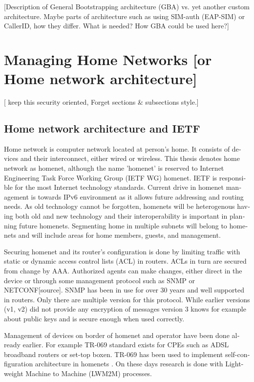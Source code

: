 \documentclass[12pt,a4paper,english]{tutthesis}
\begin{document}
\begin{otherlanguage}{english}
[Description of General Bootstrapping architecture (GBA) vs. yet
another custom architecture. Maybe parts of architecture
such as using SIM-auth (EAP-SIM) or CallerID, how they differ. 
What is needed? How GBA could be used here?]
\chapter{Managing Home Networks [or Home network architecture]}
\label{sec-3}
[ keep this security oriented, Forget sections \& subsections style.]

\section{Home network architecture and IETF}
\label{sec-3-1}


Home network is computer network located at person's home. It consists
of devices and their interconnect, either wired or wireless.  This
thesis denotes home network as homenet, although the name 'homenet'
is reserved to Internet Engineering Task Force Working Group (IETF WG) homenet.
IETF is responsible for the most Internet technology standards.
Current drive in homenet management is towards IPv6 environment
 as it allows future  addressing and routing needs. As old technology
cannot be forgotten, homenets will be heterogenous having both
old and new technology and their interoperability is important in
planning future homenets. Segmenting home in multiple subnets will belong
to homenets and will include areas for home members, guests,
and management.



Securing homenet and its router's configuration is done by limiting
traffic with static or dynamic access control lists (ACL) in
routers. ACLs in turn are secured from change by AAA. Authorized
agents can make changes, either direct in the device or through some
management protocol such as SNMP or NETCONF[source].  SNMP has been in
use for over 30 years and well supported in routers. Only there are
multiple version for this protocol. While earlier versions (v1, v2)
did not provide any encryption of messages version 3 knows for example
about public keys and is secure enough when used correctly.


Management of devices on border of homenet and operator have 
been done already earlier. For example TR-069 standard
exists \cite{iptvtr069} for CPEs such as ADSL broadband routers or
set-top boxen. TR-069 has been used to implement self-configuration
archi\-tecture in
homenets \cite{tr069rachidi2011}.
On these days research is done with Light-weight Machine to Machine
(LWM2M) processes. 



\end{otherlanguage}
\end{document}
